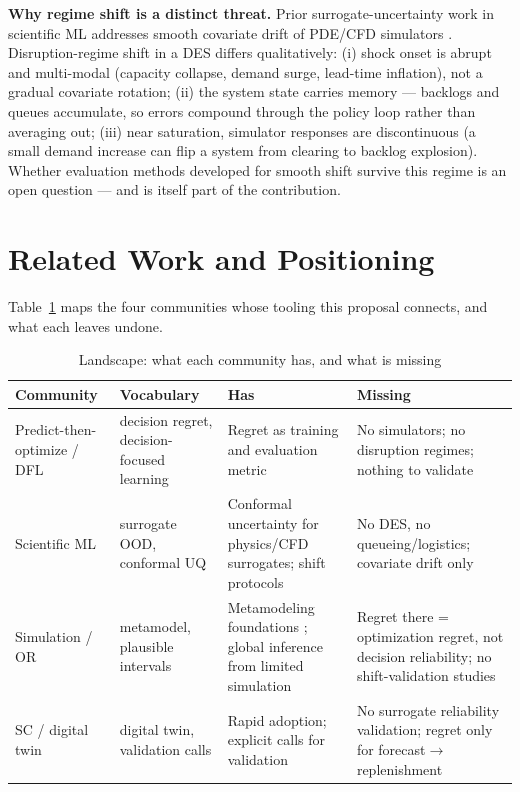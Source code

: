 \documentclass[12pt,a4paper]{article}
\begin{document}
\textbf{Why regime shift is a distinct threat.} Prior surrogate-uncertainty work in scientific ML addresses smooth covariate drift of PDE/CFD simulators \citep{gopakumar2026,tibshirani2019}. Disruption-regime shift in a DES differs qualitatively: (i) shock onset is abrupt and multi-modal (capacity collapse, demand surge, lead-time inflation), not a gradual covariate rotation; (ii) the system state carries memory --- backlogs and queues accumulate, so errors compound through the policy loop rather than averaging out; (iii) near saturation, simulator responses are discontinuous (a small demand increase can flip a system from clearing to backlog explosion). Whether evaluation methods developed for smooth shift survive this regime is an open question --- and is itself part of the contribution.

\section{Related Work and Positioning}

Table~\ref{tab:landscape} maps the four communities whose tooling this proposal connects, and what each leaves undone.

\begin{table}[H]
\centering
\caption{Landscape: what each community has, and what is missing}
\label{tab:landscape}
\footnotesize
\begin{tabular}{p{2.6cm}p{3.4cm}p{4.4cm}p{4.1cm}}
\toprule
\textbf{Community} & \textbf{Vocabulary} & \textbf{Has} & \textbf{Missing} \\
\midrule
Predict-then-optimize / DFL & decision regret, decision-focused learning & Regret as training and evaluation metric \citep{elmachtoub2022,ban2019,misic2020,im2026,fan2026,kaiyrkhan2026,libranke2026,aldridge2026,giannopoulos2026} & No simulators; no disruption regimes; nothing to validate \\
\midrule
Scientific ML & surrogate OOD, conformal UQ & Conformal uncertainty for physics/CFD surrogates; shift protocols \citep{gopakumar2026,zimmel2026,tibshirani2019,vovk2005} & No DES, no queueing/logistics; covariate drift only \\
\midrule
Simulation / OR & metamodel, plausible intervals & Metamodeling foundations \citep{sacks1989,kleijnen2015}; global inference from limited simulation \citep{qiao2026} & Regret there = optimization regret, not decision reliability; no shift-validation studies \\
\midrule
SC / digital twin & digital twin, validation calls & Rapid adoption; explicit calls for validation \citep{liu2026,huang2026,ivanov2026,soykan2026,meliani2026,tolia2026,charoenwut2026} & No surrogate reliability validation; regret only for forecast$\rightarrow$replenishment \citep{li2026ssrn} \\
\bottomrule
\end{tabular}
\end{table}
\end{document}
